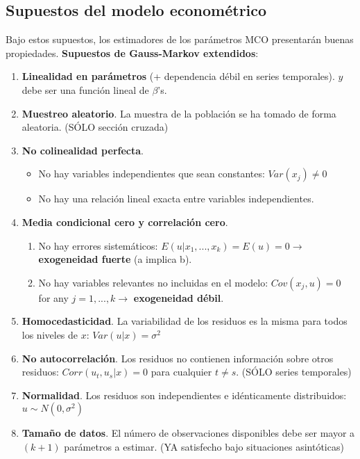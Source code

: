 \documentclass[10pt, a4paper, landscape]{extarticle}
\begin{document}
\begin{multicols}{3}
	\subsection*{Supuestos del modelo econométrico}
		Bajo estos supuestos, los estimadores de los parámetros MCO presentarán buenas propiedades. \textbf{Supuestos de Gauss-Markov extendidos}:
		\begin{enumerate}[leftmargin=*]
			\item \textbf{Linealidad en parámetros} (+ dependencia débil en series temporales). $y$ debe ser una función lineal de $\beta$'s.
			\item \textbf{Muestreo aleatorio}. La muestra de la población se ha tomado de forma aleatoria. (SÓLO sección cruzada)
			\item \textbf{No colinealidad perfecta}.
			\begin{itemize}[leftmargin=*]
				\item No hay variables independientes que sean constantes: $Var(x_j) \neq 0$
				\item No hay una relación lineal exacta entre variables independientes.
			\end{itemize}
			\item \textbf{Media condicional cero y correlación cero}.
			\begin{enumerate}[leftmargin=*, label=\alph*.]
				\item No hay errores sistemáticos: $E(u | x_1, ..., x_k) = E(u) = 0 \rightarrow$ \textbf{exogeneidad fuerte} (a implica b).
				\item No hay variables relevantes no incluidas en el modelo: $Cov(x_j , u) = 0$ for any $j = 1, ..., k \rightarrow$ \textbf{exogeneidad débil}.
			\end{enumerate}
			\item \textbf{Homocedasticidad}. La variabilidad de los residuos es la misma para todos los niveles de $x$: $Var(u | x) = \sigma^2$
			\item \textbf{No autocorrelación}. Los residuos no contienen información sobre otros residuos: $Corr(u_t, u_s | x) = 0$ para cualquier $t \neq s$. (SÓLO series temporales)
			\item \textbf{Normalidad}. Los residuos son independientes e idénticamente distribuidos: $u \sim N(0,\sigma^2)$
			\item \textbf{Tamaño de datos}. El número de observaciones disponibles debe ser mayor a $(k + 1)$ parámetros a estimar. (YA satisfecho bajo situaciones asintóticas)
		\end{enumerate}

\end{multicols}
\end{document}
